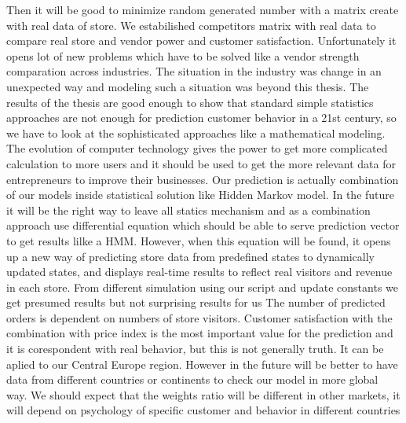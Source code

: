 Then it will be good to minimize random generated number with a matrix create with real data of store.
We estabilished competitors matrix with real data to compare real store and vendor power and customer satisfaction.
Unfortunately it opens lot of new problems which have to be solved like a vendor strength comparation across industries.
The situation in the industry was change in an unexpected way and modeling such a situation was beyond this thesis.
The results of the thesis are good enough to show that standard simple statistics approaches are not enough for prediction
customer behavior in a 21st century, so we have to look at the sophisticated approaches like a mathematical modeling.
The evolution of computer technology gives the power to get more complicated calculation to more users and it should be used
to get the more relevant data for entrepreneurs to improve their businesses.
Our prediction is actually combination of our models inside statistical solution like Hidden Markov model.
In the future it will be the right way to leave all statics mechanism and as a combination approach use differential equation
which should be able to serve prediction vector to get results lilke a HMM.
However, when this equation will be found, it opens up a new way of predicting store data from predefined states to dynamically
updated states, and displays real-time results to reflect real visitors and revenue in each store.
From different simulation using our script and update constants we get presumed results but not surprising results for us
The number of predicted orders is dependent on numbers of store visitors.
Customer satisfaction with the combination with price index is the most important value for the prediction and it is corespondent
with real behavior, but this is not generally truth.
It can be aplied to our Central Europe region.
However in the future will be better to have data from different countries or continents to check our model in more global way.
We should expect that the weights ratio will be different in other markets, it will depend on psychology of specific customer and behavior in different countries
